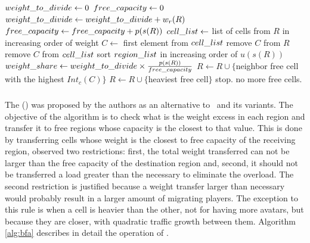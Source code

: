 \begin{algorithm}
\caption{\ggpf}
\label{alg:ggpf}
\begin{algorithmic}[1]
	 \STATE $weight\_to\_divide \leftarrow 0$
	 \STATE $free\_capacity \leftarrow 0$
	 		\STATE $weight\_to\_divide \leftarrow weight\_to\_divide + w_r(R)$
	 		\STATE $free\_capacity \leftarrow free\_capacity + p(s(R))$
	 		\STATE $cell\_list \leftarrow $ list of cells from $R$ in increasing order of weight
	 			 \STATE $C \leftarrow$ first element from $cell\_list$
	 			 \STATE remove $C$ from $R$
	 			 \STATE remove $C$ from $cell\_list$
	 		\ENDWHILE
	 \ENDFOR
	 \STATE sort $region\_list$ in increasing order of $u(s(R))$ \label{alg:ggpf:usageorder}
	 		\STATE $weight\_share \leftarrow weight\_to\_divide \times \frac{p(s(R))}{free\_capacity}$
	 		 \label{alg:ggpf:whilefraction}
	 		   		\STATE $R \leftarrow R \cup \{$neighbor free cell with the highest $Int_c(C)$$\}$
	 		   		\STATE $R \leftarrow R \cup \{$heaviest free cell$\}$ \label{alg:ggpf:freeheavycell}
	 		   \ELSE
	 		   		\STATE stop. no more free cells.
	 		   \ENDIF
	 		\ENDWHILE
	 \ENDFOR\end{algorithmic}
\end{algorithm}

\subsubsection{\bfa} %
\label{sec:alg:bfa}

The \textbf{\bfa} (\bfameaning) was proposed by the authors as an alternative to \ggp\ and its variants. The objective of the algorithm is to check what is the weight excess in each region and transfer it to free regions whose capacity is the closest to that value. This is done by transferring cells whose weight is the closest to free capacity of the receiving region, observed two restrictions: first, the total weight transferred can not be larger than the free capacity of the destination region and, second, it should not be transferred a load greater than the necessary to eliminate the overload. The second restriction is justified because a weight transfer larger than necessary would probably result in a larger amount of migrating players. The exception to this rule is when a cell is heavier than the other, not for having more avatars, but because they are closer, with quadratic traffic growth between them. Algorithm \ref{alg:bfa} describes in detail the operation of \bfa.


